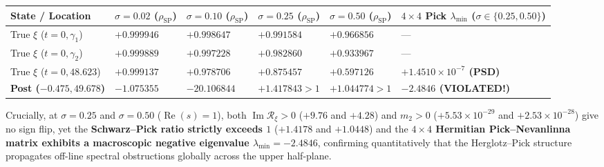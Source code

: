 \documentclass[
  11pt,
]{article}
\newcounter{none} %
\begin{document}
\begin{enumerate}
  {\def\LTcaptype{none} %
  \begin{longtable}[]{@{}
    >{\raggedright\arraybackslash}p{}
    >{\centering\arraybackslash}p{}
    >{\centering\arraybackslash}p{}
    >{\centering\arraybackslash}p{}
    >{\centering\arraybackslash}p{}
    >{\centering\arraybackslash}p{}@{}}
  \toprule\noalign{}
  \begin{minipage}[b]{\linewidth}\raggedright
  State / Location
  \end{minipage} & \begin{minipage}[b]{\linewidth}\centering
  \(\sigma = 0.02\) (\(\rho_{\text{SP}}\))
  \end{minipage} & \begin{minipage}[b]{\linewidth}\centering
  \(\sigma = 0.10\) (\(\rho_{\text{SP}}\))
  \end{minipage} & \begin{minipage}[b]{\linewidth}\centering
  \(\sigma = 0.25\) (\(\rho_{\text{SP}}\))
  \end{minipage} & \begin{minipage}[b]{\linewidth}\centering
  \(\sigma = 0.50\) (\(\rho_{\text{SP}}\))
  \end{minipage} & \begin{minipage}[b]{\linewidth}\centering
  \(4 \times 4\) Pick \(\lambda_{\min}\) (\(\sigma \in \{0.25, 0.50\}\))
  \end{minipage} \\
  \midrule\noalign{}
  \endhead
  \bottomrule\noalign{}
  \endlastfoot
  True \(\xi\) (\(t=0, \gamma_1\)) & \(+0.999946\) & \(+0.998647\) &
  \(+0.991584\) & \(+0.966856\) & --- \\
  True \(\xi\) (\(t=0, \gamma_2\)) & \(+0.999889\) & \(+0.997228\) &
  \(+0.982860\) & \(+0.933967\) & --- \\
  True \(\xi\) (\(t=0, 48.623\)) & \(+0.999137\) & \(+0.978706\) &
  \(+0.875457\) & \(+0.597126\) & \textbf{\(+1.4510 \times 10^{-7}\)
  (PSD)} \\
  \textbf{Post (\(-0.475, 49.678\))} & \(-1.075355\) & \(-20.106844\) &
  \textbf{\(+1.417843 > 1\)} & \textbf{\(+1.044774 > 1\)} &
  \textbf{\(-2.4846\) (VIOLATED!)} \\
  \end{longtable}
  }

  Crucially, at \(\sigma = 0.25\) and \(\sigma = 0.50\)
  (\(\operatorname{Re}(s) = 1\)), both
  \(\operatorname{Im}\mathcal{R}_\xi > 0\) (\(+9.76\) and \(+4.28\)) and
  \(m_2 > 0\) (\(+5.53 \times 10^{-29}\) and \(+2.53 \times 10^{-28}\))
  give no sign flip, yet the \textbf{Schwarz--Pick ratio strictly
  exceeds \(1\)} (\(+1.4178\) and \(+1.0448\)) and the
  \textbf{\(4 \times 4\) Hermitian Pick--Nevanlinna matrix exhibits a
  macroscopic negative eigenvalue \(\lambda_{\min} = -2.4846\)},
  confirming quantitatively that the Herglotz--Pick structure propagates
  off-line spectral obstructions globally across the upper half-plane.
\end{enumerate}
\end{document}
